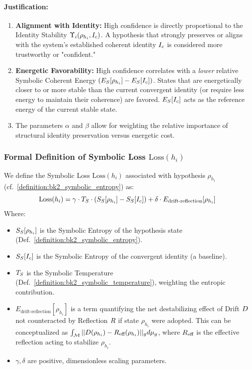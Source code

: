 \paragraph{Justification:}
\begin{enumerate}
    \item \textbf{Alignment with Identity:} High confidence is directly proportional to the Identity Stability \(\Upsilon_i(\rho_{h_i}, I_c)\). A hypothesis that strongly preserves or aligns with the system's established coherent identity \(I_c\) is considered more trustworthy or "confident."
    \item \textbf{Energetic Favorability:} High confidence correlates with a \textit{lower} relative Symbolic Coherent Energy \((E_S[\rho_{h_i}] - E_S[I_c])\). States that are energetically closer to or more stable than the current convergent identity (or require less energy to maintain their coherence) are favored. \(E_S[I_c]\) acts as the reference energy of the current stable state.
    \item The parameters \(\alpha\) and \(\beta\) allow for weighting the relative importance of structural identity preservation versus energetic cost.
\end{enumerate}
\subsubsection{Formal Definition of Symbolic Loss \(\text{Loss}
\label{subsubsec:bk7_formal_definition_of_symbolic_loss_loss}(h_i)\)}
We define the Symbolic Loss \(\text{Loss}(h_i)\) associated with hypothesis \(\rho_{h_i}\) (cf.~\ref{definition:bk2_symbolic_entropy}) as:
\begin{equation}
\text{Loss}(h_i) = \gamma \cdot T_S \cdot (S_S[\rho_{h_i}] - S_S[I_c]) + \delta \cdot E_{\text{drift-reflection}}[\rho_{h_i}]
\label{eq:bk7_symbolic_loss}
\end{equation}
Where:
\begin{itemize}
    \item \(S_S[\rho_{h_i}]\) is the Symbolic Entropy of the hypothesis state (Def.~\ref{definition:bk2_symbolic_entropy}).
    \item \(S_S[I_c]\) is the Symbolic Entropy of the convergent identity (a baseline).
    \item \(T_S\) is the Symbolic Temperature (Def.~\ref{definition:bk2_symbolic_temperature}), weighting the entropic contribution.
    \item \(E_{\text{drift-reflection}}[\rho_{h_i}]\) is a term quantifying the net destabilizing effect of Drift \(D\) not counteracted by Reflection \(R\) if state \(\rho_{h_i}\) were adopted. This can be conceptualized as \(\int_{\mathcal{M}} ||D(\rho_{h_i}) - R_{\text{eff}}(\rho_{h_i})||_g d\mu_{g}\), where \(R_{\text{eff}}\) is the effective reflection acting to stabilize \(\rho_{h_i}\).
    \item \(\gamma, \delta\) are positive, dimensionless scaling parameters.
\end{itemize}
